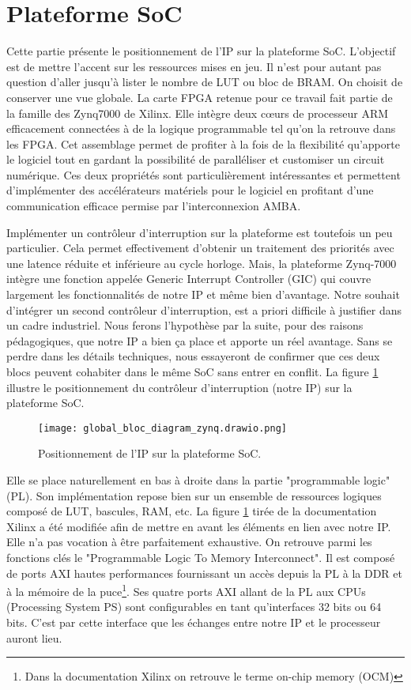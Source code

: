\section{Plateforme SoC}
Cette partie présente le positionnement de l'IP sur la plateforme SoC.
L'objectif est de mettre l'accent sur les ressources mises en jeu.
Il n'est pour autant pas question d'aller jusqu'à lister le nombre de LUT ou bloc de BRAM.
On choisit de conserver une vue globale.
La carte FPGA retenue pour ce travail fait partie de la famille des Zynq7000 de Xilinx.
Elle intègre deux cœurs de processeur ARM efficacement connectées à de la logique programmable tel qu'on la retrouve dans les FPGA.
Cet assemblage permet de profiter à la fois de la flexibilité qu'apporte le logiciel tout en gardant la possibilité de paralléliser et customiser un circuit numérique.
Ces deux propriétés sont particulièrement intéressantes et permettent d'implémenter des accélérateurs matériels pour le logiciel en profitant d'une communication efficace permise par l'interconnexion AMBA\mbox{\textregistered }.

Implémenter un contrôleur d'interruption sur la plateforme est toutefois un peu particulier.
Cela permet effectivement d'obtenir un traitement des priorités avec une latence réduite et inférieure au cycle horloge.
Mais, la plateforme Zynq-7000 intègre une fonction appelée Generic Interrupt Controller (GIC) qui couvre largement les fonctionnalités de notre IP et même bien d'avantage.
Notre souhait d'intégrer un second contrôleur d'interruption, est a priori difficile à justifier dans un cadre industriel.
Nous ferons l'hypothèse par la suite, pour des raisons pédagogiques, que notre IP a bien ça place et apporte un réel avantage.
Sans se perdre dans les détails techniques, nous essayeront de confirmer que ces deux blocs peuvent cohabiter dans le même SoC sans entrer en conflit.
La figure \ref{fig:soc} illustre le positionnement du contrôleur d'interruption (notre IP) sur la plateforme SoC.
\begin{figure}[H]
    \centering
    \texttt{[image: global\_bloc\_diagram\_zynq.drawio.png]}
    \caption{Positionnement de l'IP sur la plateforme SoC.}
    \label{fig:soc}
\end{figure}
Elle se place naturellement en bas à droite dans la partie "programmable logic" (PL).
Son implémentation repose bien sur un ensemble de ressources logiques composé de LUT, bascules, RAM, etc.
La figure \ref{fig:soc} tirée de la documentation Xilinx \cite{Tech_Man_Xilinx} a été modifiée afin de mettre en avant les éléments en lien avec notre IP.
Elle n'a pas vocation à être parfaitement exhaustive.
On retrouve parmi les fonctions clés le "Programmable Logic To Memory Interconnect".
Il est composé de ports AXI hautes performances fournissant un accès depuis la PL à la DDR et à la mémoire de la puce\footnote{Dans la documentation Xilinx on retrouve le terme on-chip memory (OCM)}.
Ses quatre ports AXI allant de la PL aux CPUs (Processing System PS) sont configurables en tant qu'interfaces 32 bits ou 64 bits.
C'est par cette interface que les échanges entre notre IP et le processeur auront lieu.

